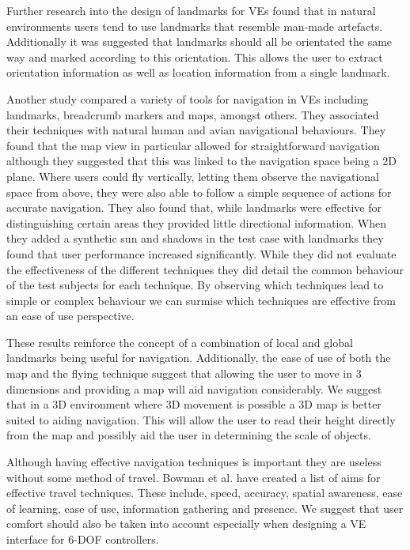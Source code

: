 \documentclass{sig-alternate-05-2015}
\begin{document}
Further research into the design of landmarks for VEs found that in natural environments users tend to use landmarks that resemble man-made artefacts\cite{Vinson1999}. Additionally it was suggested that landmarks should all be orientated the same way and marked according to this orientation. This allows the user to extract orientation information as well as location information from a single landmark.

Another study compared a variety of tools for navigation in VEs including landmarks, breadcrumb markers and maps, amongst others\cite{Darken1993}. They associated their techniques with natural human and avian  navigational behaviours. They found that the map view in particular allowed for straightforward navigation although they suggested that this was linked to the navigation space being a 2D plane. Where users could fly vertically, letting them observe the navigational space from above, they were also able to follow a simple sequence of actions for accurate navigation. They also found that, while landmarks were effective for distinguishing certain areas they provided little directional information. When they added a synthetic sun and shadows in the test case with landmarks they found that user performance increased significantly. While they did not evaluate the effectiveness of the different techniques they did detail the common behaviour of the test subjects for each technique. By observing which techniques lead to simple or complex behaviour we can surmise which techniques are effective from an ease of use perspective.

These results reinforce the concept of a combination of local and global landmarks being useful for navigation\cite{Darken1993}. Additionally, the ease of use of both the map and the flying technique suggest that allowing the user to move in 3 dimensions and providing a map will aid navigation considerably. We suggest that in a 3D environment where 3D movement is possible a 3D map is better suited to aiding navigation. This will allow the user to read their height directly from the map and possibly aid the user in determining the scale of objects.

Although having effective navigation techniques is important they are useless without some method of travel. Bowman et al. have created a list of aims for effective travel techniques.\cite{Bowman1997} These include, speed, accuracy, spatial awareness, ease of learning, ease of use, information gathering and presence. We suggest that user comfort should also be taken into account especially when designing a VE interface for 6-DOF controllers.
\end{document}

